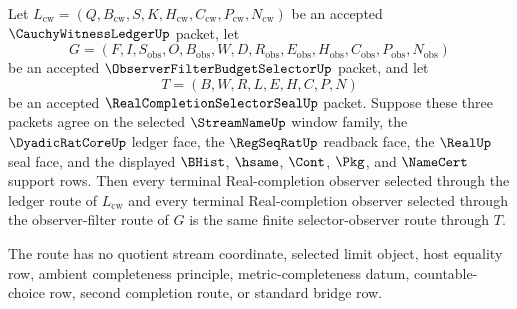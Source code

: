 \begin{theorem}
\label{thm:cauchy-witness-ledger-terminal-selector-observer-uniqueness}
Let $L_{\mathrm{cw}}=(Q,B_{\mathrm{cw}},S,K,H_{\mathrm{cw}},C_{\mathrm{cw}},P_{\mathrm{cw}},N_{\mathrm{cw}})$ be an accepted $\CauchyWitnessLedgerUp$ packet, let
$$
G=(F,I,S_{\mathrm{obs}},O,B_{\mathrm{obs}},W,D,R_{\mathrm{obs}},E_{\mathrm{obs}},H_{\mathrm{obs}},C_{\mathrm{obs}},P_{\mathrm{obs}},N_{\mathrm{obs}})
$$
be an accepted $\ObserverFilterBudgetSelectorUp$ packet, and let
$$
T=(B,W,R,L,E,H,C,P,N)
$$
be an accepted $\RealCompletionSelectorSealUp$ packet. Suppose these three packets agree on the selected $\StreamNameUp$ window family, the $\DyadicRatCoreUp$ ledger face, the $\RegSeqRatUp$ readback face, the $\RealUp$ seal face, and the displayed $\BHist$, $\hsame$, $\Cont$, $\Pkg$, and $\NameCert$ support rows. Then every terminal Real-completion observer selected through the ledger route of $L_{\mathrm{cw}}$ and every terminal Real-completion observer selected through the observer-filter route of $G$ is the same finite selector-observer route through $T$.

The route has no quotient stream coordinate, selected limit object, host equality row, ambient completeness principle, metric-completeness datum, countable-choice row, second completion route, or standard bridge row.
\end{theorem}
